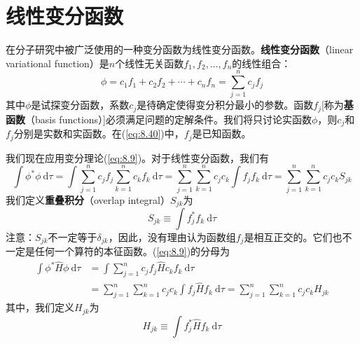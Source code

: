 \section{线性变分函数}
\label{sec:8.5 Linear Variational Functions}
    在分子研究中被广泛使用的一种变分函数为线性变分函数。\textbf{线性变分函数}（linear variational function）是$n$个线性无关函数$f_1,f_2,\ldots,f_n$的线性组合：
    \begin{equation}
        \phi = c_1f_1 + c_2f_2 + \cdots + c_nf_n = \sum_{j=1}^{n}c_jf_j
        \label{eq:8.40}
    \end{equation}
    其中$\phi$是试探变分函数，系数$c_j$是待确定使得变分积分最小的参数。函数$f_j$[称为\textbf{基函数}（basis functions）]必须满足问题的定解条件。我们将只讨论实函数$\phi$，则$c_j$和$f_j$分别是实数和实函数。在(\ref{eq:8.40})中，$f_j$是已知函数。

    我们现在应用变分理论(\ref{eq:8.9})。对于线性变分函数，我们有
    \begin{equation}
        \int \phi^{\ast} \phi \: \mathrm{d}\tau = \int \sum_{j=1}^{n}c_jf_j \sum_{k=1}^{n}c_kf_k\:\mathrm{d}\tau = \sum_{j=1}^{n}\sum_{k=1}^{n}c_jc_k\int f_jf_k \: \mathrm{d}\tau = \sum_{j=1}^{n}\sum_{k=1}^{n}c_jc_kS_{jk}
        \label{eq:8.41}
    \end{equation}
    我们定义\textbf{重叠积分}（overlap integral）$S_{jk}$为
    \begin{equation}
        \boxed{
            S_{jk} \equiv \int f_j^{\ast}f_k \: \mathrm{d}\tau
        }
        \label{eq:8.42}
    \end{equation}
    注意：$S_{jk}$不一定等于$\delta_{jk}$，因此，没有理由认为函数组$f_j$是相互正交的。它们也不一定是任何一个算符的本征函数。(\ref{eq:8.9})的分母为
    \begin{equation*}
        \begin{aligned}
            \int \phi^{\ast} \hat{H} \phi\:\mathrm{d}\tau &= \int \sum_{j=1}^{n}c_jf_j\hat{H}c_kf_k\:\mathrm{d}\tau \\
            &= \sum_{j=1}^{n}\sum_{k=1}^{n}c_jc_k\int f_j\hat{H}f_k\:\mathrm{d}\tau = \sum_{j=1}^{n}\sum_{k=1}^{n}c_jc_kH_{jk}
        \end{aligned}
    \end{equation*}
    其中，我们定义$H_{jk}$为
    \begin{equation}
        \boxed{
            H_{jk} \equiv \int f_j^{\ast}\hat{H}f_k \: \mathrm{d}\tau
        }
        \label{eq:8.43}
    \end{equation}

